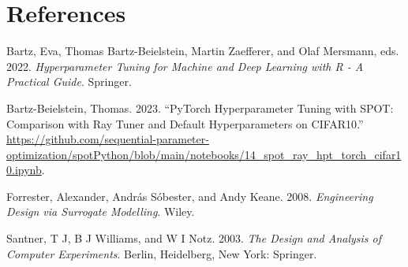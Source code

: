 \documentclass[
  letterpaper,
  DIV=11,
  numbers=noendperiod]{scrreprt}
\newlength{\cslhangindent}
\newenvironment{CSLReferences}[2] %
 {\begin{list}{}{%
  \setlength{\itemindent}{0pt}
  \setlength{\leftmargin}{0pt}
  \setlength{\parsep}{0pt}
  \ifodd #1
   \setlength{\leftmargin}{\cslhangindent}
   \setlength{\itemindent}{-1\cslhangindent}
  \fi
  \setlength{\itemsep}{#2\baselineskip}}}
 {\end{list}}
\begin{document}
\chapter*{References}\label{references}


\label{refs}
\begin{CSLReferences}{1}{0}
Bartz, Eva, Thomas Bartz-Beielstein, Martin Zaefferer, and Olaf
Mersmann, eds. 2022. \emph{{Hyperparameter Tuning for Machine and Deep
Learning with R - A Practical Guide}}. Springer.

Bartz-Beielstein, Thomas. 2023. {``{PyTorch} Hyperparameter Tuning with
{SPOT}: Comparison with {Ray Tuner} and Default Hyperparameters on
{CIFAR10}.''}
\url{https://github.com/sequential-parameter-optimization/spotPython/blob/main/notebooks/14_spot_ray_hpt_torch_cifar10.ipynb}.

Forrester, Alexander, András Sóbester, and Andy Keane. 2008.
\emph{{Engineering Design via Surrogate Modelling}}. Wiley.

Santner, T J, B J Williams, and W I Notz. 2003. \emph{{The Design and
Analysis of Computer Experiments}}. Berlin, Heidelberg, New York:
Springer.

\end{CSLReferences}
\end{document}
